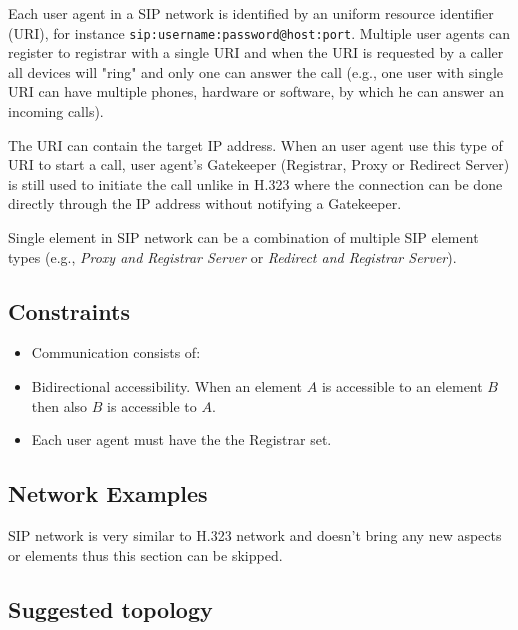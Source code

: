 \documentclass[a4paper]{report}
\begin{document}
Each user agent in a SIP network is identified by an uniform resource identifier (URI), for instance \verb|sip:username:password@host:port|. Multiple user agents can register to registrar with a single URI and when the URI is requested by a caller all devices will "ring" and only one can answer the call (e.g., one user with single URI can have multiple phones, hardware or software, by which he can answer an incoming calls).

The URI can contain the target IP address. When an user agent use this type of URI to start a call, user agent's Gatekeeper (Registrar, Proxy or Redirect Server) is still used to initiate the call unlike in H.323 where the connection can be done directly through the IP address without notifying a Gatekeeper.

Single element in SIP network can be a combination of multiple SIP element types (e.g., \emph{Proxy and Registrar Server} or \emph{Redirect and Registrar Server}).

\subsection{Constraints}

\begin{itemize}

\item Communication consists of:

\item Bidirectional accessibility. When an element $A$ is accessible to an element $B$ then also $B$ is accessible to $A$.

\item Each user agent must have the the Registrar set.

\end{itemize}

\subsection{Network Examples}

SIP network is very similar to H.323 network and doesn't bring any new aspects or elements thus this section can be skipped.

\subsection{Suggested topology}
\end{document}
